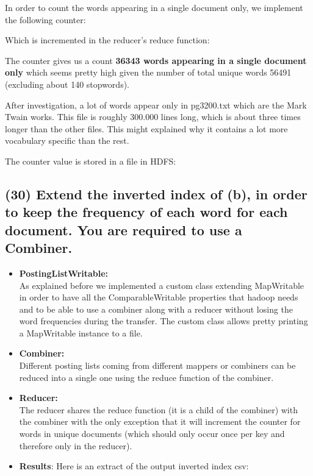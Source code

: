 \documentclass[a4paper,10pt]{article}
\begin{document}
In order to count the words appearing in a single document only, we implement the following counter:

Which is incremented in the reducer's reduce function:


The counter gives us a count \textbf{36343 words appearing in a single document only}
which seems pretty high given the number of total unique words 56491
(excluding about 140 stopwords).

After investigation, a lot of words appear only in pg3200.txt which are the Mark Twain works.
This file is roughly 300.000 lines long, which is about three times longer than the other files.
This might explained why it contains a lot more vocabulary specific than the rest.

The counter value is stored in a file in HDFS:


\subsection{(30) Extend the inverted index of (b), in order to keep the frequency of each word for
each document. You are required to use a Combiner.}
\begin{itemize}
  \item \textbf{PostingListWritable:}\\
  As explained before we implemented a custom class extending MapWritable in order to have
  all the ComparableWritable properties that hadoop needs and to be able to use a
  combiner along with a reducer without losing the word frequencies during the transfer.
  The custom class allows pretty printing a MapWritable instance to a file.
  
  \item \textbf{Combiner:}\\
  Different posting lists coming from different mappers or combiners can be reduced
  into a single one using the reduce function of the combiner.
  
  \item \textbf{Reducer:}\\
  The reducer shares the reduce function (it is a child of the combiner) with the combiner with the only exception
  that it will increment the counter for words in unique documents (which should only occur
  once per key and therefore only in the reducer).
  
  \item \textbf{Results}:
  Here is an extract of the output inverted index csv:
  
\end{itemize}
\end{document}
